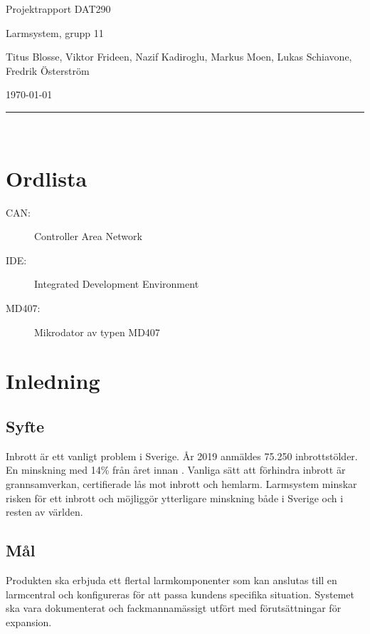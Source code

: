 \documentclass[a4paper]{article}
\newcommand\namn{Larmsystem}
\begin{document}
\thispagestyle{empty}

\begin{center}
    \parskip=14pt
    \vspace*{3\parskip}

    {\LARGE Projektrapport DAT290}

    {\large \namn, grupp 11

    Titus Blosse, Viktor Frideen, Nazif Kadiroglu, Markus Moen, Lukas Schiavone, Fredrik Österström

    \today}

    \rule{7cm}{0.4pt}\\
\end{center}
\newpage

\thispagestyle{empty}

\tableofcontents
\newpage


\section*{Ordlista}

\begin{description}
    \item[CAN:] Controller Area Network
    \item[IDE:] Integrated Development Environment
    \item[MD407:] Mikrodator av typen MD407
\end{description}
\newpage

\section{Inledning}
\subsection{Syfte}
Inbrott är ett vanligt problem i Sverige. År 2019 anmäldes 75.250 inbrottstölder. En minskning med 14\% från året innan \cite{brastold}. Vanliga sätt att förhindra inbrott är grannsamverkan, certifierade lås mot inbrott och hemlarm. Larmsystem minskar risken för ett inbrott och möjliggör ytterligare minskning både i Sverige och i resten av världen.

\subsection{Mål}

Produkten ska erbjuda ett flertal larmkomponenter som kan anslutas till en larmcentral och konfigureras för att passa kundens specifika situation. Systemet ska vara dokumenterat och fackmannamässigt utfört med förutsättningar för expansion.
\end{document}
